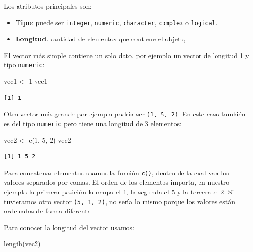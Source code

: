 \documentclass[
  spanish,
  a4paper,
]{scrbook}
\newenvironment{Shaded}{\begin{snugshade}}{\end{snugshade}}
\newcommand{\DecValTok}[1]{\textcolor[rgb]{0.68,0.00,0.00}{#1}}
\newcommand{\FunctionTok}[1]{\textcolor[rgb]{0.28,0.35,0.67}{#1}}
\newcommand{\NormalTok}[1]{\textcolor[rgb]{0.00,0.23,0.31}{#1}}
\newcommand{\OtherTok}[1]{\textcolor[rgb]{0.00,0.23,0.31}{#1}}
\begin{document}
Los atributos principales son:

\begin{itemize}
\item
  \textbf{Tipo}: puede ser \texttt{integer}, \texttt{numeric},
  \texttt{character}, \texttt{complex} o \texttt{logical}.
\item
  \textbf{Longitud}: cantidad de elementos que contiene el objeto,
\end{itemize}

El vector más simple contiene un solo dato, por ejemplo un vector de
longitud 1 y tipo \texttt{numeric}:

\begin{Shaded}
\begin{Highlighting}[]
\NormalTok{vec1 }\OtherTok{\textless{}{-}} \DecValTok{1}
\NormalTok{vec1}
\end{Highlighting}
\end{Shaded}

\begin{verbatim}
[1] 1
\end{verbatim}

Otro vector más grande por ejemplo podría ser \texttt{(1,\ 5,\ 2)}. En
este caso también es del tipo \texttt{numeric} pero tiene una longitud
de 3 elementos:

\begin{Shaded}
\begin{Highlighting}[]
\NormalTok{vec2 }\OtherTok{\textless{}{-}} \FunctionTok{c}\NormalTok{(}\DecValTok{1}\NormalTok{, }\DecValTok{5}\NormalTok{, }\DecValTok{2}\NormalTok{)}
\NormalTok{vec2}
\end{Highlighting}
\end{Shaded}

\begin{verbatim}
[1] 1 5 2
\end{verbatim}

Para concatenar elementos usamos la función \texttt{c()}, dentro de la
cual van los valores separados por comas. El orden de los elementos
importa, en nuestro ejemplo la primera posición la ocupa el 1, la
segunda el 5 y la tercera el 2. Si tuvieramos otro vector
\texttt{(5,\ 1,\ 2)}, no sería lo mismo porque los valores están
ordenados de forma diferente.

Para conocer la longitud del vector usamos:

\begin{Shaded}
\begin{Highlighting}[]
\FunctionTok{length}\NormalTok{(vec2)}
\end{Highlighting}
\end{Shaded}
\end{document}
